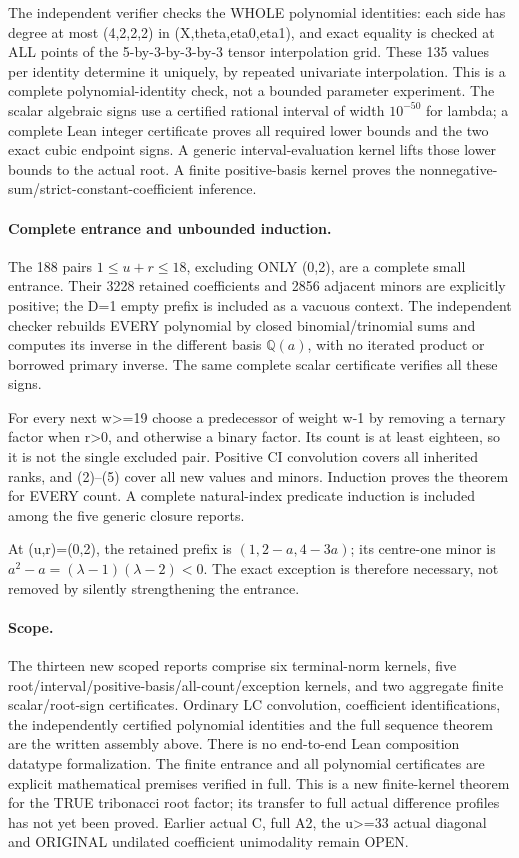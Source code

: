 The independent verifier checks the WHOLE polynomial identities:
each side has degree at most (4,2,2,2) in (X,theta,eta0,eta1),
and exact equality is checked at ALL points of the 5-by-3-by-3-by-3
tensor interpolation grid. These 135 values per identity determine
it uniquely, by repeated univariate interpolation. This is a complete
polynomial-identity check, not a bounded parameter experiment.
The scalar algebraic signs use a certified rational interval of
width $10^{-50}$ for lambda; a complete Lean integer certificate
proves all required lower bounds and the two exact cubic endpoint
signs. A generic interval-evaluation kernel lifts those lower bounds
to the actual root. A finite positive-basis kernel proves the
nonnegative-sum/strict-constant-coefficient inference.

\paragraph{Complete entrance and unbounded induction.}
The 188 pairs $1\le u+r\le18$, excluding ONLY (0,2), are a
complete small entrance. Their 3228 retained coefficients and
2856 adjacent minors are explicitly positive; the D=1 empty prefix
is included as a vacuous context. The independent checker rebuilds
EVERY polynomial by closed binomial/trinomial sums and computes its
inverse in the different basis $\mathbb Q(a)$, with no iterated
product or borrowed primary inverse. The same complete scalar
certificate verifies all these signs.

For every next w>=19 choose a predecessor of weight w-1 by removing
a ternary factor when r>0, and otherwise a binary factor. Its count
is at least eighteen, so it is not the single excluded pair.
Positive CI convolution covers all inherited ranks, and
(2)--(5) cover all new values and minors. Induction proves the theorem
for EVERY count. A complete natural-index predicate induction is
included among the five generic closure reports.

At (u,r)=(0,2), the retained prefix is
$(1,2-a,4-3a)$; its centre-one minor is
$a^2-a=(\lambda-1)(\lambda-2)<0$. The exact exception is therefore
necessary, not removed by silently strengthening the entrance.

\paragraph{Scope.}
The thirteen new scoped reports comprise six terminal-norm kernels,
five root/interval/positive-basis/all-count/exception kernels, and
two aggregate finite scalar/root-sign certificates. Ordinary LC
convolution, coefficient identifications, the independently certified
polynomial identities and the full sequence theorem are the written
assembly above. There is no end-to-end Lean composition datatype
formalization. The finite entrance and all polynomial certificates
are explicit mathematical premises verified in full.
This is a new finite-kernel theorem for the TRUE tribonacci root
factor; its transfer to full actual difference profiles has not yet
been proved. Earlier actual C, full A2, the u>=33 actual diagonal and
ORIGINAL undilated coefficient unimodality remain OPEN.
